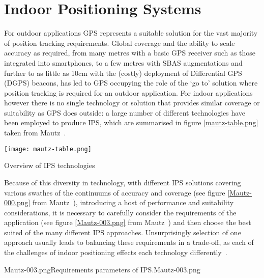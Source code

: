 

\section{Indoor Positioning Systems}

For outdoor applications GPS represents a suitable solution for the vast majority of position tracking requirements. Global coverage and the ability to scale accuracy as required, from many metres with a basic GPS receiver such as those integrated into smartphones, to a few metres with SBAS augmentations and further to as little as 10cm with the (costly) deployment of Differential GPS (DGPS) beacons, has led to GPS occupying the role of the `go to' solution where position tracking is required for an outdoor application. For indoor applications however there is no single technology or solution that provides similar coverage or suitability as GPS does outside: a large number of different technologies have been employed to produce IPS, which are summarised in figure \ref{mautz-table.png} taken from Mautz~\cite{Mautz2012}.

\begin{table}
	\begin{center}
		\texttt{[image: mautz-table.png]}
	\end{center}
	\caption{Overview of IPS technologies}
	\label{mautz-table.png}
\end{table}

Because of this diversity in technology, with different IPS solutions covering various swathes of the continuums of accuracy and coverage (see figure \ref{Mautz-000.png} from Mautz~\cite{Mautz2012}), introducing a host of performance and suitability considerations, it is necessary to carefully consider the requirements of the application (see figure \ref{Mautz-003.png} from Mautz~\cite{Mautz2012}) and then choose the best suited of the many different IPS approaches. Unsurprisingly selection of one approach usually leads to balancing these requirements in a trade-off, as each of the challenges of indoor positioning effects each technology differently~\cite{Mautz2009}.

       {Mautz-003.png}{Requirements parameters of IPS.}{Mautz-003.png}

